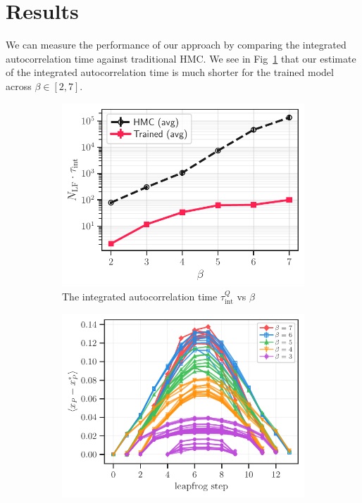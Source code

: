 \documentclass[a4paper,11pt]{article}
\begin{document}
\section{\label{sec:results}Results}
We can measure the performance of our approach by comparing the integrated
autocorrelation time against traditional HMC.
%
We see in Fig~\ref{fig:autocorr} that our estimate of the integrated
autocorrelation time is much shorter for the trained model across \(\beta \in
[2, 7]\).
%
\begin{figure}[htpb]
    \centering
    \begin{subfigure}[b]{0.47\textwidth}
        \includegraphics[width=\textwidth]{assets/autocorr_vs_beta.pdf}
        \caption{\label{fig:autocorr} The integrated autocorrelation
        time \(\tau_{\mathrm{int}}^{Q}\) vs \(\beta\)}
    \end{subfigure}
    \hfill
    \begin{subfigure}[b]{0.49\textwidth}
        \includegraphics[width=\textwidth]{assets/plaqsf_leapfrog.pdf}

\end{subfigure}
\end{figure}
\end{document}
